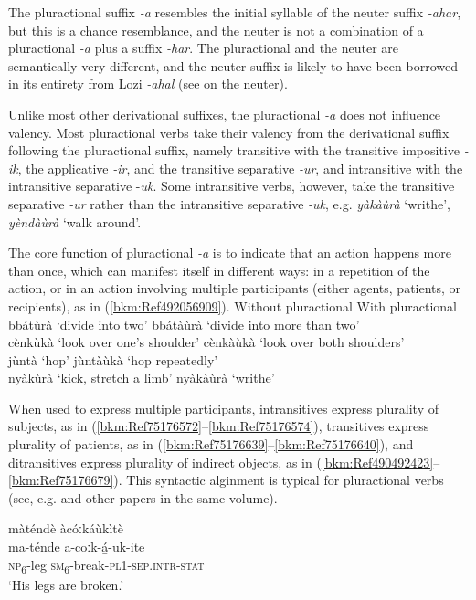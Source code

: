 The pluractional suffix \textit{-a} resembles the initial syllable of the neuter suffix \textit{-ahar}, but this is a chance resemblance, and the neuter is not a combination of a pluractional \textit{-a} plus a suffix \textit{-har}. The pluractional and the neuter are semantically very different, and the neuter suffix is likely to have been borrowed in its entirety from Lozi \textit{-ahal} (see  on the neuter).

Unlike most other derivational suffixes, the pluractional \textit{-a} does not influence valency. Most pluractional verbs take their valency from the derivational suffix following the pluractional suffix, namely transitive with the transitive impositive \textit{-ik}, the applicative \textit{-ir}, and the transitive separative \textit{-ur}, and intransitive with the intransitive separative \nobreakdash-\textit{uk}. Some intransitive verbs, however, take the transitive separative \textit{-ur} rather than the intransitive separative \textit{-uk}, e.g. \textit{yàkàùrà} ‘writhe’, \textit{yèndàùrà} ‘walk around’.

The core function of pluractional \textit{-a} is to indicate that an action happens more than once, which can manifest itself in different ways: in a repetition of the action, or in an action involving multiple participants (either agents, patients, or recipients), as in (\ref{bkm:Ref492056909}).
\ea
\label{bkm:Ref492056909}
Without pluractional \tab With pluractional\\
bbátùrà ‘divide into two’ \tab bbátàùrà ‘divide into more than two’\\
cènkùkà ‘look over one’s shoulder’ \tab cènkàùkà ‘look over both shoulders’\\
jùntà ‘hop’ \tab jùntàùkà ‘hop repeatedly’\\
nyàkùrà ‘kick, stretch a limb’ \tab nyàkàùrà ‘writhe’\\
\z

When used to express multiple participants, intransitives express plurality of subjects, as in (\ref{bkm:Ref75176572}--\ref{bkm:Ref75176574}), transitives express plurality of patients, as in (\ref{bkm:Ref75176639}--\ref{bkm:Ref75176640}), and ditransitives express plurality of indirect objects, as in (\ref{bkm:Ref490492423}--\ref{bkm:Ref75176679}). This syntactic alginment is typical for pluractional verbs (see, e.g. \citealt{StorchColy2017} and other papers in the same volume).

\ea
\label{bkm:Ref75176572}
màténdè àcóːkáùkìtè\\
\gll ma-ténde  a-coːk-á̲-uk-ite\\
\textsc{np}\textsubscript{6}-leg  \textsc{sm}\textsubscript{6}-break-\textsc{pl}1-\textsc{sep}.\textsc{intr}-\textsc{stat}\\
\glt ‘His legs are broken.’
\z

